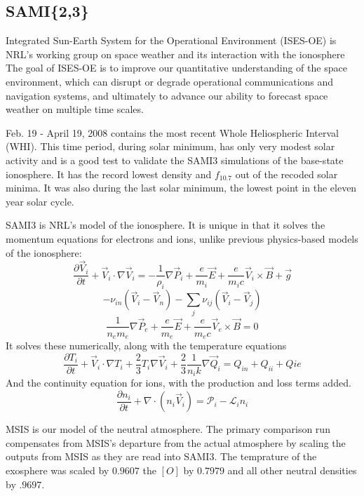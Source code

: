 \documentclass[journal,twoside]{IEEEtran}
\begin{document}
\subsection{SAMI\{2,3\}}

  {Integrated Sun-Earth System for the Operational Environment (ISES-OE)} is NRL's working group on space weather and its interaction with the ionosphere
    The goal of ISES-OE is to improve our quantitative understanding of the space environment, which can disrupt or degrade operational communications and navigation systems, and ultimately to advance our ability to forecast space weather on multiple time scales.
  
  Feb. 19 - April 19, 2008 contains the most recent Whole Heliospheric Interval (WHI).  This time period, during solar minimum, has only very modest solar activity and is a good test to validate the SAMI3 simulations of the base-state ionosphere. It has the record lowest density and $f_{10.7}$ out of the recoded solar minima. It was also during the last solar minimum, the lowest point in the eleven year solar cycle.

SAMI3 is NRL's model of the ionosphere. It is unique in that it solves the momentum equations for electrons and ions, unlike previous physics-based models of the ionosphere:
  \[ \frac{\partial \vec V_i}{\partial t} + \vec V_i \cdot \nabla \vec V_i = 
     -\frac1{\rho_i} \nabla\vec P_i 
     + \frac e{m_i}\vec E + \frac e{m_ic} \vec V_i \times \vec B 
     +\vec g \]
  \[  -\nu_{in} \left( \vec V_i -\vec V_n \right)
     -\sum_j \nu_{ij} \left( \vec V_i -\vec V_j\right) \]
  \[\frac1{n_e m_e} \nabla \vec P_e + \frac e{m_e} \vec E + \frac e{m_ec} \vec V_e \times \vec B = 0 \]
It solves these numerically, along with the temperature equations
  \[\frac{\partial T_i}{\partial t} + \vec V_i \cdot \nabla T_i + \frac23 T_i \nabla \vec V_i 
  +\frac23 \frac1{n_i k} \nabla \vec Q_i =Q_{in} + Q_{ii} +Q{ie} \]
  And the continuity equation for ions, with the production and loss terms added.
  \[ \frac{\partial n_i}{\partial t} + \nabla \cdot \left( n_i\vec V_i \right) = \mathcal P_i - \mathcal L_i n_i \]

  MSIS is our model of the neutral atmosphere.  The primary comparison run compensates from MSIS's departure from the actual atmosphere by scaling the outputs from MSIS as they are read into SAMI3. The temprature of the exosphere was scaled by $0.9607$ the $[O]$ by $0.7979$ and all other neutral densities by $.9697$. 

\end{document}
